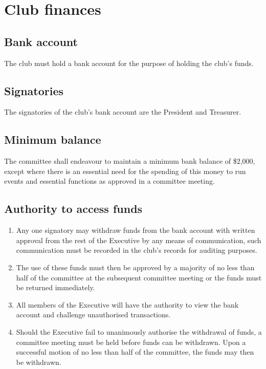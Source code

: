 \documentclass{constitution}
\begin{document}
\section{Club finances}

\subsection{Bank account}
The club must hold a bank account for the purpose of holding the club's funds.

\subsection{Signatories}
The signatories of the club’s bank account are the President and Treasurer.

\subsection{Minimum balance}
The committee shall endeavour to maintain a minimum bank balance of \$2,000, except where there is an essential need for the spending of this money to run events and essential functions as approved in a committee meeting.

\subsection{Authority to access funds}
\begin{enumerate}[(1)]
    \item Any one signatory may withdraw funds from the bank account with written approval from the rest of the Executive by any means of communication, such communication must be recorded in the club's records for auditing purposes.
    \item The use of these funds must then be approved by a majority of no less than half of the committee at the subsequent committee meeting or the funds must be returned immediately.
    \item All members of the Executive will have the authority to view the bank account and challenge unauthorised transactions.
    \item Should the Executive fail to unanimously authorise the withdrawal of funds, a committee meeting must be held before funds can be withdrawn. Upon a successful motion of no less than half of the committee, the funds may then be withdrawn.
\end{enumerate}
\end{document}
